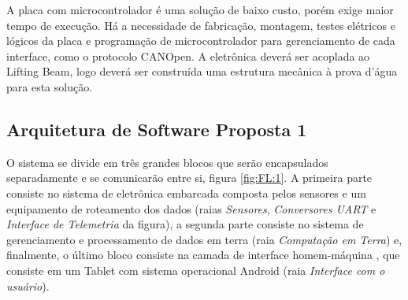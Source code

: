 A placa com microcontrolador é uma solução de baixo custo, porém exige maior
tempo de execução. Há a necessidade de fabricação, montagem, testes elétricos e lógicos da placa e programação de microcontrolador para gerenciamento de cada interface, como o protocolo CANOpen.
A eletrônica deverá ser acoplada ao Lifting Beam, logo deverá ser construída uma estrutura mecânica à prova d’água para esta solução.

\subsection{Arquitetura de Software Proposta 1}
O sistema se divide em três grandes blocos que serão encapsulados separadamente
e se comunicarão entre si, figura \ref{fig:FL:1}. A primeira parte consiste no
sistema de eletrônica embarcada composta pelos sensores e um equipamento de
roteamento dos dados (raias \emph{Sensores}, \emph{Conversores UART} e \emph{Interface de
Telemetria} da figura), a segunda parte consiste no sistema de gerenciamento e
processamento de dados em terra (raia \emph{Computação em Terra}) e, finalmente, o
último bloco consiste na camada de interface homem-máquina , que consiste em um
Tablet com sistema operacional Android (raia \emph{Interface com o usuário}).


